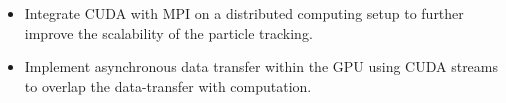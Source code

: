 \begin{itemize}
\item Integrate CUDA with MPI on a distributed computing setup to further improve the scalability of the particle tracking.
\item Implement asynchronous data transfer within the GPU using CUDA streams to overlap the data-transfer with computation.
\end{itemize}
